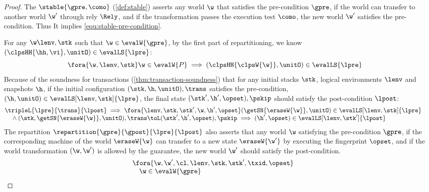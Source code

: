 \begin{proof}
The \( \stable{\gpre, \como} \) (\cref{def:stable}) asserts any world \( \w \) that satisfies the pre-condition \( \gpre \), 
if the world can transfer to another world \( \w' \) through rely \( \Rely \), and if the transformation passes the execution test \( \como \), 
the new world \( \w' \) satisfies the pre-condition.
Thus It implies \cref{equ:stable-pre-condition}. 

For any \( \w \lenv, \stk \) such that \( \w \in \evalW{\gpre} \), by the first part of repartitioning, we know \( (\clpsHH{\hh, \vi}, \unitO) \in \evalLS{\lpre} \):
\begin{equation}
\label{equ:local-pre-condition}
\fora{\w, \lenv, \stk} \w \in \evalW{P} \implies (\clpsHH{\clpsW{\w}}, \unitO) \in \evalLS{\lpre}
\end{equation}
Because of the soundness for transactions (\cref{thm:transaction-soundness}) that for any initial stacks \( \stk \), logical environments \( \lenv \) and snapshots \( \h \), if the initial configuration \( (\stk, \h, \unitO), \trans \) satisfies the pre-condition, \ie \( (\h, \unitO) \in \evalLS[\lenv,\stk]{\lpre} \), the final state \( (\stk', \h', \opset), \pskip \) should satisfy the post-condition \( \lpost \):
\begin{equation}
\label{equ:local-transaction-sound}
\begin{array}{@{}l}
    \tripleL{\lpre}{\trans}{\lpost} \implies 
    \fora{\lenv, \stk, \stk', \w, \h', \opset}
    (\getSN{\eraseW{\w}}, \unitO) \in \evalLS[\lenv,\stk]{\lpre} \\
    \quad {} \land (\stk, \getSN{\eraseW{\w}}, \unitO), \trans \toL (\stk', \h', \opset), \pskip
    \implies (\h', \opset) \in \evalLS[\lenv,\stk']{\lpost}
\end{array}
\end{equation}
The repartition \( \repartition{\gpre}{\gpost}{\lpre}{\lpost} \) also asserts that any world \( \w \) satisfying the pre-condition \( \gpre \), if the corresponding machine of the world \( \eraseW{\w} \) can transfer to a new state \( \eraseW{\w'} \) by executing the fingerprint \( \opset \), and if the world transformation \( (\w, \w') \) is allowed by the guarantee, the new world \( \w' \) should satisfy the post-condition.
\begin{equation}
\label{equ:repartition}
\begin{array}{@{}l}
    \fora{\w, \w', \cl, \lenv, \stk, \stk', \txid, \opset} \\
    \quad \w \in \evalW{\gpre}

\end{array}
\end{equation}
\end{proof}
